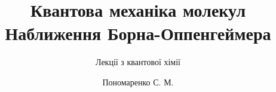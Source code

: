 \documentclass[]{beamer}
\title[Лекції з квантової хімії]{{\huge\bfseries Квантова механіка молекул}\\ Наближення Борна-Оппенгеймера}
\subtitle{Лекції з квантової хімії}
\date{}
\author{Пономаренко С. М.}
\begin{document}

\begin{frame}
	\thispagestyle{empty}
	\titlepage
\end{frame}





%
\end{document}
